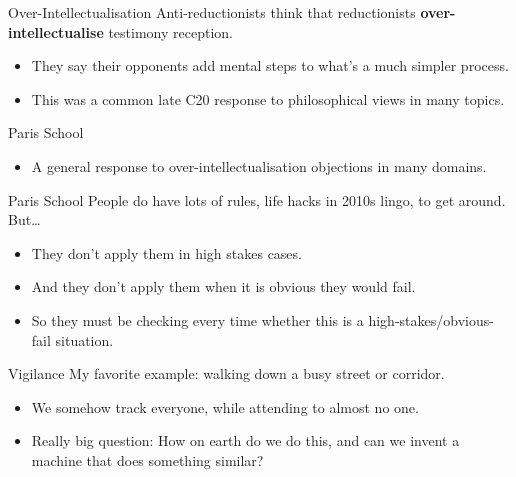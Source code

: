 \documentclass[
  17pt,
  letterpaper,
  ignorenonframetext,
  aspectratio=169,
  handout]{beamer}
\providecommand{\tightlist}{%
  \setlength{\itemsep}{0pt}\setlength{\parskip}{0pt}}\usepackage{longtable,booktabs,array}
\begin{document}
\begin{frame}{Over-Intellectualisation}
\protect\hypertarget{over-intellectualisation}{}
Anti-reductionists think that reductionists
\textbf{over-intellectualise} testimony reception.

\begin{itemize}[<+->]
\tightlist
\item
  They say their opponents add mental steps to what's a much simpler
  process.
\item
  This was a common late C20 response to philosophical views in many
  topics.
\end{itemize}
\end{frame}

\begin{frame}{Paris School}
\protect\hypertarget{paris-school}{}
\begin{itemize}[<+->]
\tightlist
\item
  A general response to over-intellectualisation objections in many
  domains.
\end{itemize}
\end{frame}

\begin{frame}{Paris School}
\protect\hypertarget{paris-school-1}{}
People do have lots of rules, life hacks in 2010s lingo, to get around.
But\ldots{}

\begin{itemize}[<+->]
\tightlist
\item
  They don't apply them in high stakes cases.
\item
  And they don't apply them when it is obvious they would fail.
\item
  So they must be checking every time whether this is a
  high-stakes/obvious-fail situation.
\end{itemize}
\end{frame}

\begin{frame}{Vigilance}
\protect\hypertarget{vigilance}{}
My favorite example: walking down a busy street or corridor.

\begin{itemize}[<+->]
\tightlist
\item
  We somehow track everyone, while attending to almost no one.
\item
  Really big question: How on earth do we do this, and can we invent a
  machine that does something similar?
\end{itemize}
\end{frame}
\end{document}
